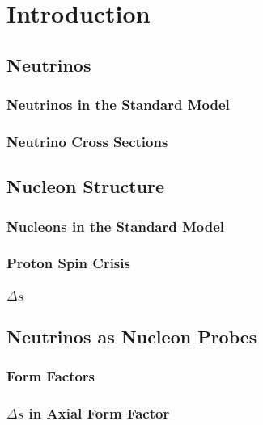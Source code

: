 \section{Introduction} \label{intro}
\hspace{\parindent}

\subsection{Neutrinos}\label{nutheory}
  \subsubsection{Neutrinos in the Standard Model}
  \subsubsection{Neutrino Cross Sections}

\subsection{Nucleon Structure}\label{nucleon}
  \subsubsection{Nucleons in the Standard Model}
  \subsubsection{Proton Spin Crisis}
  \subsubsection{$\Delta s$}

\subsection{Neutrinos as Nucleon Probes}\label{probe}
  \subsubsection{Form Factors}
  \subsubsection{$\Delta s$ in Axial Form Factor}

